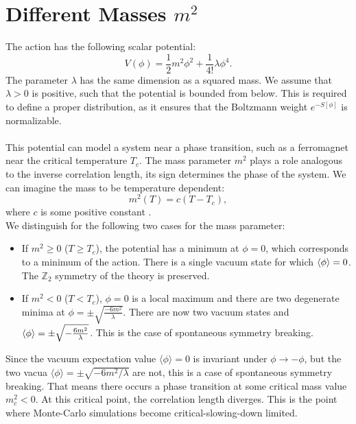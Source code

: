 \section{Different Masses \texorpdfstring{$m^2$}{m2}}
The action has the following scalar potential: 
\begin{equation}
    V(\phi) = \frac{1}{2}m^2\phi^2 + \frac{1}{4!}\lambda \phi^4. 
\end{equation}
The parameter $\lambda$ has the same dimension as a squared mass.
We assume that $\lambda > 0$ is positive, such that the potential is bounded from below. This is required to define a proper distribution, as it ensures that the Boltzmann weight $e^{-S[\phi]}$ is normalizable. \\\\
This potential can model a system near a phase transition, such as a ferromagnet near the critical temperature $T_c$. The mass parameter $m^2$ plays a role analogous to the inverse correlation length, its sign determines the phase of the system. 
We can imagine the mass to be temperature dependent: 
\begin{equation}
    m^2(T) = c(T - T_c), 
\end{equation}
where $c$ is some positive constant \cite{SchwartzQFT}. \\
We distinguish for the following two cases for the mass parameter: 
\begin{itemize}
    \item If $m^2 \geq 0$ ($T \geq T_c$), the potential has a minimum at $\phi = 0$, which corresponds to a minimum of the action. There is a single vacuum state for which $\braket{\phi} = 0$. The $\mathbb{Z}_2$ symmetry of the theory is preserved. 
    \item If $m^2 < 0$ ($ T < T_c$), $\phi = 0$ is a local maximum and there are two degenerate minima at $\phi = \pm \sqrt{\frac{-6m^2}{\lambda}}$. There are now two vacuum states and $\braket{\phi} = \pm \sqrt{-\frac{6m^2}{\lambda}}$. This is the case of spontaneous symmetry breaking. 
\end{itemize}
Since the vacuum expectation value $\langle \phi \rangle = 0$ is invariant under $\phi \to -\phi$, but the two vacua $\langle \phi \rangle = \pm \sqrt{-6 m^{2} / \lambda}$ are not, this is a case of spontaneous symmetry breaking. That means there occurs a phase transition at some critical mass value $m_c^2 < 0$. At this critical point, the correlation length diverges. This is the point where Monte-Carlo simulations become critical-slowing-down limited. 
\\\\
